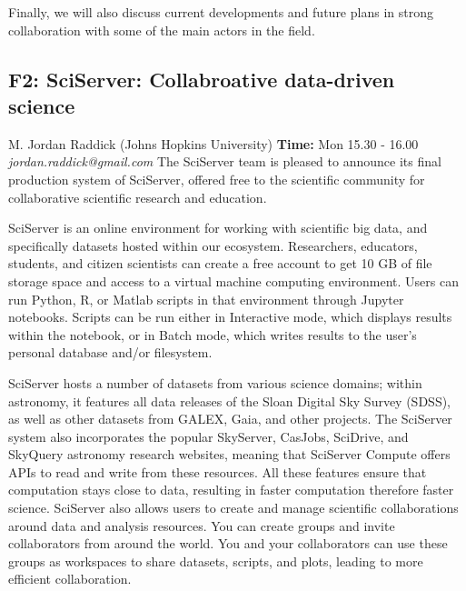 \documentclass{report}
\begin{document}
Finally, we will also discuss current developments and future plans in strong collaboration with some of the main actors in the field.\newline
\newpage
\subsection*{F2: SciServer: Collabroative data-driven science}
\bigskip
M. Jordan Raddick (Johns Hopkins University) \newline   \newline   \newline   \newline  \newline  \newline\newline
{\bf Time:} Mon 15.30 - 16.00\newline
\newline
{\it jordan.raddick@gmail.com}\newline
\newline\newline
The SciServer team is pleased to announce its final production system of SciServer, offered free to the scientific community for collaborative scientific research and education.

SciServer is an online environment for working with scientific big data, and specifically datasets hosted within our ecosystem. Researchers, educators, students, and citizen scientists can create a free account to get 10 GB of file storage space and access to a virtual machine computing environment. Users can run Python, R, or Matlab scripts in that environment through Jupyter notebooks. Scripts can be run either in Interactive mode, which displays results within the notebook, or in Batch mode, which writes results to the user’s personal database and/or filesystem.

SciServer hosts a number of datasets from various science domains; within astronomy, it features all data releases of the Sloan Digital Sky Survey (SDSS), as well as other datasets from GALEX, Gaia, and other projects. The SciServer system also incorporates the popular SkyServer, CasJobs, SciDrive, and SkyQuery astronomy research websites, meaning that SciServer Compute offers APIs to read and write from these resources. All these features ensure that computation stays close to data, resulting in faster computation therefore faster science.
SciServer also allows users to create and manage scientific collaborations around data and analysis resources. You can create groups and invite collaborators from around the world. You and your collaborators can use these groups as workspaces to share datasets, scripts, and plots, leading to more efficient collaboration.
\end{document}
